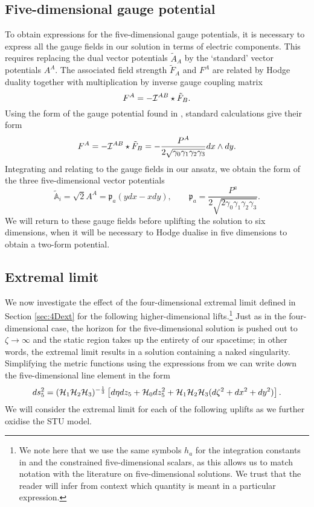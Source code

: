 \subsection*{Five-dimensional gauge potential}

To obtain expressions for the five-dimensional gauge potentials,
it is necessary to express all the gauge fields in our solution in terms of electric components. This
requires replacing the dual vector potentials $\tilde{A}_A$ by the `standard'
 vector potentials $A^A$. The associated field strength $\tilde{F}_A$ and $F^A$ are related by Hodge duality together with multiplication by inverse gauge coupling matrix
 \begin{equation*}
    F^A = -{\cal I}^{AB} \star \tilde{F}_B.
\end{equation*}
Using the form of the gauge potential found in , standard calculations give their form
\begin{equation}
\label{eq:5dfield}
    F^A = -{\cal I}^{AB} \star \tilde{F}_B = - \frac{P^A}{2\sqrt{\gamma_0 \gamma_1 \gamma_2 \gamma_3}} dx \wedge dy.
\end{equation}
Integrating and relating to the gauge fields in our ansatz, we obtain the form of the three five-dimensional vector potentials
\begin{equation}
\label{eq:5dvec}
    \tilde{\mathbb{A}}_i = \sqrt{2} A^A = \mathfrak{p}_a \left(y dx - x dy \right), \qquad \mathfrak{p}_a = \frac{ P^a}{2 \sqrt{2 \gamma_0 \gamma_1 \gamma_2 \gamma_3}} .
\end{equation}
We will return to these gauge fields before uplifting the solution to six dimensions, when it will be necessary to Hodge dualise in five dimensions to obtain a two-form potential.

\subsection*{Extremal limit}
We now investigate the effect of the four-dimensional extremal limit defined in Section \ref{sec:4Dext} for the following higher-dimensional lifts.\footnote{We note here that we use the same symbols $h_a$ for the integration constants in  and the constrained five-dimensional scalars, as this allows us to match notation with the literature on five-dimensional solutions. We trust that the reader will infer from context which quantity is meant in a particular expression.} Just as in the four-dimensional case, the horizon for the five-dimensional solution is pushed out to $\zeta \rightarrow \infty$ and the static region takes up the entirety of our spacetime; in other words, the extremal limit results in a solution containing a naked singularity. Simplifying the metric functions using the expressions from  we can write down the five-dimensional line element in the form
\begin{equation*}
    ds^2_5 = ({\cal H}_1{\cal H}_2{\cal H}_3)^{-\frac{1}{3}} \left[d\eta dz_5 + {\cal H}_0 dz_5^2 + {\cal H}_1{\cal H}_2{\cal H}_3 (d\zeta^2 + dx^2 + dy^2) \right].
\end{equation*}
We will consider the extremal limit for each of the following uplifts as we further oxidise the STU model.

